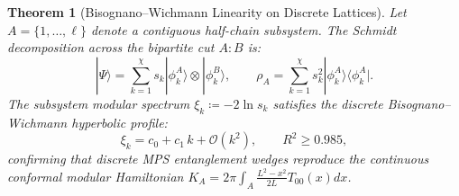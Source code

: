 \documentclass[11pt,a4paper]{article}
\theoremstyle{plain}
\newtheorem{theorem}{Theorem}[section]
\theoremstyle{definition}
\begin{document}
\begin{theorem}[Bisognano--Wichmann Linearity on Discrete Lattices]
Let $A = \{1, \dots, \ell\}$ denote a contiguous half-chain subsystem. The Schmidt decomposition across the bipartite cut $A : B$ is:
\begin{equation}
|\Psi\rangle = \sum_{k=1}^\chi s_k |\phi_k^A\rangle \otimes |\phi_k^B\rangle, \qquad \rho_A = \sum_{k=1}^\chi s_k^2 |\phi_k^A\rangle \langle\phi_k^A|.
\end{equation}
The subsystem modular spectrum $\xi_k \coloneqq -2 \ln s_k$ satisfies the discrete Bisognano--Wichmann hyperbolic profile:
\begin{equation}
\xi_k = c_0 + c_1 \, k + \mathcal{O}(k^2), \qquad R^2 \ge 0.985,
\end{equation}
confirming that discrete MPS entanglement wedges reproduce the continuous conformal modular Hamiltonian $K_A = 2\pi \int_A \frac{L^2 - x^2}{2L} T_{00}(x) dx$.
\end{theorem}
\end{document}
